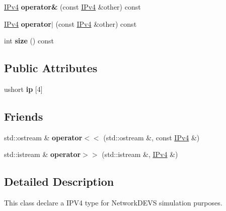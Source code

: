 \begin{DoxyCompactItemize}
\item 
\hyperlink{structIPv4}{I\+Pv4} {\bfseries operator\&} (const \hyperlink{structIPv4}{I\+Pv4} \&other) const \hypertarget{structIPv4_a63975afd93012938a25911e670396cbe}{}\label{structIPv4_a63975afd93012938a25911e670396cbe}

\item 
\hyperlink{structIPv4}{I\+Pv4} {\bfseries operator$\vert$} (const \hyperlink{structIPv4}{I\+Pv4} \&other) const \hypertarget{structIPv4_af7e0b46fd7a4515d5a0a61f93517774d}{}\label{structIPv4_af7e0b46fd7a4515d5a0a61f93517774d}

\item 
int {\bfseries size} () const \hypertarget{structIPv4_a607922ab456f0f29a8b1ca5c48e3ed38}{}\label{structIPv4_a607922ab456f0f29a8b1ca5c48e3ed38}

\end{DoxyCompactItemize}
\subsection*{Public Attributes}
\begin{DoxyCompactItemize}
\item 
ushort {\bfseries ip} \mbox{[}4\mbox{]}\hypertarget{structIPv4_afa52210d2b97527f5e64cc307860983f}{}\label{structIPv4_afa52210d2b97527f5e64cc307860983f}

\end{DoxyCompactItemize}
\subsection*{Friends}
\begin{DoxyCompactItemize}
\item 
std\+::ostream \& {\bfseries operator$<$$<$} (std\+::ostream \&, const \hyperlink{structIPv4}{I\+Pv4} \&)\hypertarget{structIPv4_ab5644dcfa13678c430f256332e31c671}{}\label{structIPv4_ab5644dcfa13678c430f256332e31c671}

\item 
std\+::istream \& {\bfseries operator$>$$>$} (std\+::istream \&, \hyperlink{structIPv4}{I\+Pv4} \&)\hypertarget{structIPv4_a47e7e07277bbcacf06f17b1c2fc59f7f}{}\label{structIPv4_a47e7e07277bbcacf06f17b1c2fc59f7f}

\end{DoxyCompactItemize}


\subsection{Detailed Description}
This class declare a I\+P\+V4 type for Network\+D\+E\+VS simulation purposes. 

